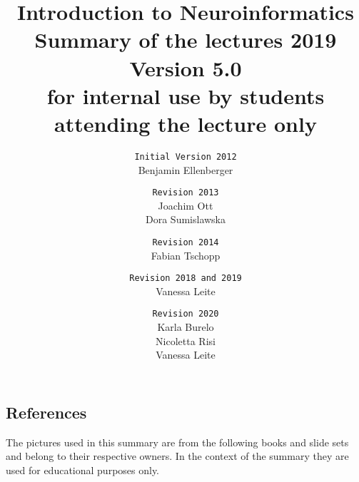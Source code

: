 \documentclass[a4paper, 12pt]{article}
\title{\textbf{Introduction to Neuroinformatics} \\Summary of the lectures
2019\\\normalsize Version 5.0 \\
for internal use by students attending the lecture only}
\author{
\texttt{Initial Version 2012}\\
	Benjamin Ellenberger
\and
\texttt{Revision 2013}\\
	Joachim Ott\\Dora Sumislawska
\and
\texttt{Revision 2014}\\
	Fabian Tschopp
\and
\texttt{Revision 2018 and 2019}\\
	Vanessa Leite
\and
\texttt{Revision 2020}\\
	Karla Burelo\\ Nicoletta Risi\\ Vanessa Leite}
\date{}
\begin{document}
\maketitle
\newpage
\tableofcontents
\newpage

\newpage





























\newpage
\subsection{References}
The pictures used in this summary are from the following books and slide sets and belong to their respective owners.
In the context of the summary they are used for educational purposes only.
\end{document}
